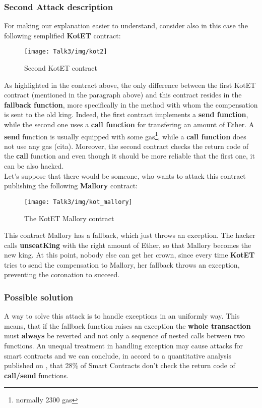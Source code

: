 \subsubsection{Second Attack description}
For making our explanation easier to understand, consider also in this case the following semplified \textbf{KotET} contract: 
\begin{figure}[H]
\begin{center}
\texttt{[image: Talk3/img/kot2]}
\end{center}
\caption{Second KotET contract}
\label{label}
\end{figure}
As highlighted in the contract above, the only difference between the first KotET contract (mentioned in the paragraph above) and this contract resides in the \textbf{fallback function}, more specifically in the method with whom the compensation is sent to the old king. Indeed, the first contract implements a \textbf{send function}, while the second one uses a \textbf{call function} for transfering an amount of Ether. A \textbf{send} function is usually equipped with some gas\footnote{normally 2300 gas}, while a \textbf{call function} does not use any gas (cita). 
Moreover, the second contract checks the return code of the \textbf{call} function and even though it should be more reliable that the first one, it can be also hacked. \\
Let's suppose that there would be someone, who wants to attack this contract publishing the following \textbf{Mallory} contract: 
\begin{figure}[H]
\begin{center}
\texttt{[image: Talk3/img/kot\_mallory]}
\end{center}
\caption{The KotET Mallory contract}
\label{label}
\end{figure}

This contract Mallory has a fallback, which just throws an exception. The hacker calls \textbf{unseatKing} with the right amount of Ether, so that Mallory becomes the new king. 
At this point, nobody else can get her crown, since every time \textbf{KotET} tries to send the compensation to Mallory, her fallback throws an exception, preventing the coronation to succeed. 

\subsubsection{Possible solution}
A way to solve this attack is to handle exceptions in an uniformly way. This means, that if the fallback function raises an exception the \textbf{whole transaction} must \textbf{always }be reverted and not only a sequence of nested calls \cite{paper2} between two functions. An unequal treatment in handling exception may cause attacks for smart contracts and we can conclude, in accord to a quantitative analysis published on \cite{anal}, that 28\% of Smart Contracts don't check the return code of \textbf{call/send} functions. 

